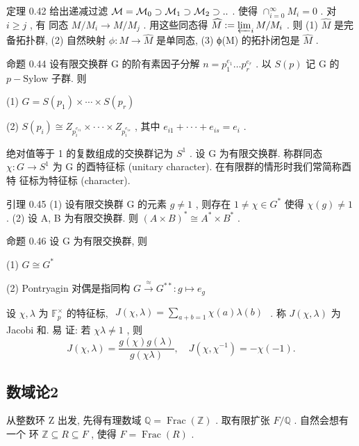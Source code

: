\documentclass[]{article}
\begin{document}
{定理 0.42 给出递减过滤 ${ \cal M } = { \cal M } _ { 0 } \supset { \cal M } _ { 1 } \supset { \cal M } _ { 2 } \supset . .$ . 使得 $\cap _ { i = 0 } ^ { \infty } M _ { i } = 0$ . 对 $i \geqslant j$ , 有 同态 $M / M _ { i } \to M / M _ { j }$ . 用这些同态得 $\widehat { M } : = \varprojlim _ { i } M / M _ { i }$ . 则 (1) $\widehat { M }$ 是完备拓扑群, (2) 自然映射 $\phi : M \to { \widehat { M } }$ 是单同态, (3) ϕ(M) 的拓扑闭包是 $\widehat { M }$ . 

命题 0.44 设有限交换群 G 的阶有素因子分解 $n = p _ { 1 } ^ { e _ { 1 } } \ldots p _ { r } ^ { e _ { r } }$ . 以 $S ( p )$ 记 G 的 $\scriptstyle p - \mathrm { S y l o w }$ 子群. 则 

(1) $G = S ( p _ { 1 } ) \times \cdots \times S ( p _ { r } )$ 

(2) $S ( p _ { i } ) \cong Z _ { p _ { i } ^ { e _ { i 1 } } } \times \cdot \cdot \cdot \times Z _ { p _ { i } ^ { e _ { i s } } }$ , 其中 $e _ { i 1 } + \cdot \cdot \cdot + e _ { i s } = e _ { i }$ . 

绝对值等于 1 的复数组成的交换群记为 $S ^ { 1 }$ . 设 G 为有限交换群. 称群同态 $\chi : G \to S ^ { 1 }$ 为 G 的酉特征标 (unitary character). 在有限群的情形时我们常简称酉特 征标为特征标 (character). 

引理 0.45 (1) 设有限交换群 G 的元素 $g \neq 1$ , 则存在 $1 \neq \chi \in G ^ { * }$ 使得 $\chi ( g ) \neq 1$ . (2) 设 A, B 为有限交换群. 则 $( A \times B ) ^ { * } \cong A ^ { * } \times B ^ { * }$ . 

命题 0.46 设 G 为有限交换群, 则 

(1) $G \cong G ^ { * }$ 

(2) Pontryagin 对偶是指同构 $G \stackrel { \approx } { \longrightarrow } G ^ { * * } : g \mapsto e _ { g }$ 

设 $\chi , \lambda$ 为 $\mathbb { F } _ { p } ^ { \times }$ 的特征标, $\begin{array} { r } { J ( \chi , \lambda ) = \sum _ { a + b = 1 } \chi ( a ) \lambda ( b ) } \end{array}$ . 称 $J ( \chi , \lambda )$ 为 Jacobi 和. 易 证: 若 $\chi \lambda \neq 1$ , 则 $$
J (\chi , \lambda) = \frac {g (\chi) g (\lambda)}{g (\chi \lambda)}, \quad J (\chi , \chi^ {- 1}) = - \chi (- 1).
$$
 

\subsection{数域论2} 

从整数环 Z 出发, 先得有理数域 $\mathbb { Q } = \operatorname { F r a c } ( \mathbb { Z } )$ . 取有限扩张 $F / \mathbb { Q }$ . 自然会想有一个 环 $\mathbb { Z } \subseteq R \subseteq F$ , 使得 $F = \operatorname { F r a c } ( R )$ . 

}
\end{document}
